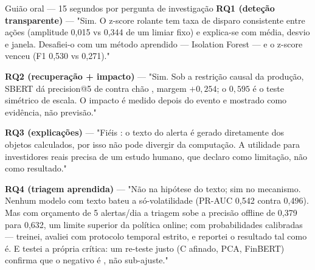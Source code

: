 \documentclass[aspectratio=169,11pt]{beamer}
\newcommand{\key}[1]{\textbf{\structure{#1}}}
\begin{document}
\begin{frame}{Guião oral — 15 segundos por pergunta de investigação}
\scriptsize
\textbf{RQ1 (deteção transparente)} --- "Sim. O z-score rolante tem taxa de disparo consistente
entre ações (amplitude 0,015 vs 0,344 de um limiar fixo) e explica-se com média, desvio e janela.
Desafiei-o com um método aprendido --- Isolation Forest --- e o z-score venceu (F1 0,530 vs 0,271)."
\vspace{1mm}

\textbf{RQ2 (recuperação + impacto)} --- "Sim. Sob a restrição causal da produção, SBERT dá
precision@5 de \key{0,513} contra chão \key{0,259}, margem $+0,254$; o $0,595$ é o teste simétrico
de escala. O impacto é medido depois do evento e mostrado como evidência, não previsão."
\vspace{1mm}

\textbf{RQ3 (explicações)} --- "Fiéis \key{por construção}: o texto do alerta é gerado diretamente
dos objetos calculados, por isso não pode divergir da computação. A utilidade para investidores
reais precisa de um estudo humano, que declaro como limitação, não como resultado."
\vspace{1mm}

\textbf{RQ4 (triagem aprendida)} --- "Não na hipótese do texto; sim no mecanismo. Nenhum modelo
com texto bateu a só-volatilidade (PR-AUC 0,542 contra 0,496). Mas com orçamento de 5 alertas/dia
a triagem sobe a precisão offline de 0,379 para 0,632, um limite superior da política online;
com probabilidades calibradas --- treinei, avaliei
com protocolo temporal estrito, e reportei o resultado tal como é. E testei a própria crítica: um
re-teste justo (C afinado, PCA, FinBERT) confirma que o negativo é \key{robusto}, não sub-ajuste."
\end{frame}
\end{document}

